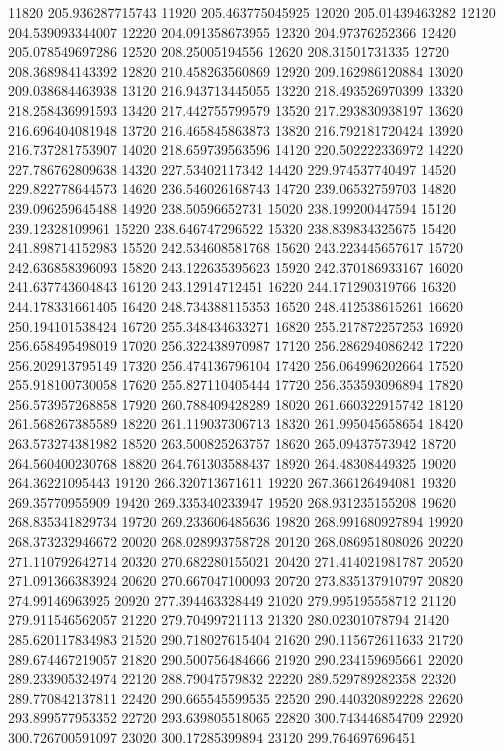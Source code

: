 {11820 205.936287715743
11920 205.463775045925
12020 205.01439463282
12120 204.539093344007
12220 204.091358673955
12320 204.97376252366
12420 205.078549697286
12520 208.25005194556
12620 208.31501731335
12720 208.368984143392
12820 210.458263560869
12920 209.162986120884
13020 209.038684463938
13120 216.943713445055
13220 218.493526970399
13320 218.258436991593
13420 217.442755799579
13520 217.293830938197
13620 216.696404081948
13720 216.465845863873
13820 216.792181720424
13920 216.737281753907
14020 218.659739563596
14120 220.502222336972
14220 227.786762809638
14320 227.53402117342
14420 229.974537740497
14520 229.822778644573
14620 236.546026168743
14720 239.06532759703
14820 239.096259645488
14920 238.50596652731
15020 238.199200447594
15120 239.12328109961
15220 238.646747296522
15320 238.839834325675
15420 241.898714152983
15520 242.534608581768
15620 243.223445657617
15720 242.636858396093
15820 243.122635395623
15920 242.370186933167
16020 241.637743604843
16120 243.12914712451
16220 244.171290319766
16320 244.178331661405
16420 248.734388115353
16520 248.412538615261
16620 250.194101538424
16720 255.348434633271
16820 255.217872257253
16920 256.658495498019
17020 256.322438970987
17120 256.286294086242
17220 256.202913795149
17320 256.474136796104
17420 256.064996202664
17520 255.918100730058
17620 255.827110405444
17720 256.353593096894
17820 256.573957268858
17920 260.788409428289
18020 261.660322915742
18120 261.568267385589
18220 261.119037306713
18320 261.995045658654
18420 263.573274381982
18520 263.500825263757
18620 265.09437573942
18720 264.560400230768
18820 264.761303588437
18920 264.48308449325
19020 264.36221095443
19120 266.320713671611
19220 267.366126494081
19320 269.35770955909
19420 269.335340233947
19520 268.931235155208
19620 268.835341829734
19720 269.233606485636
19820 268.991680927894
19920 268.373232946672
20020 268.028993758728
20120 268.086951808026
20220 271.110792642714
20320 270.682280155021
20420 271.414021981787
20520 271.091366383924
20620 270.667047100093
20720 273.835137910797
20820 274.99146963925
20920 277.394463328449
21020 279.995195558712
21120 279.911546562057
21220 279.70499721113
21320 280.02301078794
21420 285.620117834983
21520 290.718027615404
21620 290.115672611633
21720 289.674467219057
21820 290.500756484666
21920 290.234159695661
22020 289.233905324974
22120 288.79047579832
22220 289.529789282358
22320 289.770842137811
22420 290.665545599535
22520 290.440320892228
22620 293.899577953352
22720 293.639805518065
22820 300.743446854709
22920 300.726700591097
23020 300.17285399894
23120 299.764697696451
}
